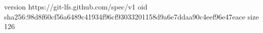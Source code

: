 version https://git-lfs.github.com/spec/v1
oid sha256:98d8f60cf56a6489c41934f96cf93033201158d9a6e7ddaa90c4eef96e47eace
size 126
